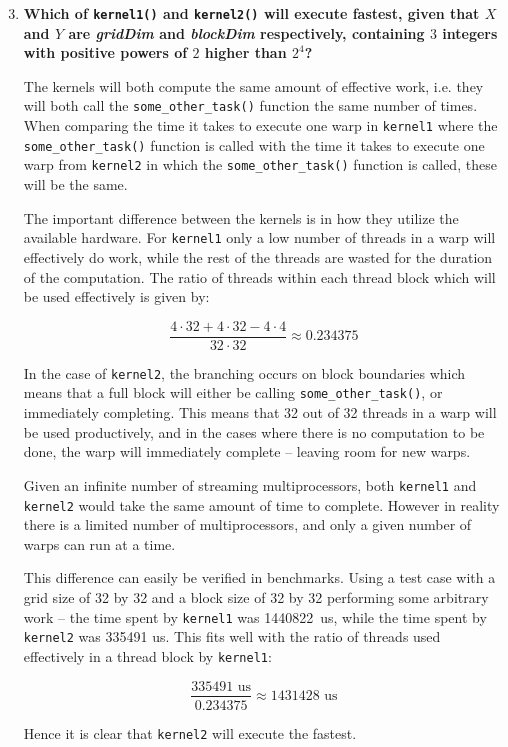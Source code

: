 \begin{enumerate}
\setcounter{enumi}{2}
\item \textbf{Which of \texttt{kernel1()} and \texttt{kernel2()} will execute fastest, given that $X$ and $Y$ are \textit{gridDim} and \textit{blockDim} respectively, containing $3$ integers with positive powers of $2$ higher than $2^4$?}

The kernels will both compute the same amount of effective work, i.e. they will both call the \texttt{some\_other\_task()} function the same number of times. When comparing the time it takes to execute one warp in \texttt{kernel1} where the \texttt{some\_other\_task()} function is called with the time it takes to execute one warp from \texttt{kernel2} in which the \texttt{some\_other\_task()} function is called, these will be the same.

The important difference between the kernels is in how they utilize the available hardware. For \texttt{kernel1} only a low number of threads in a warp will effectively do work, while the rest of the threads are wasted for the duration of the computation. The ratio of threads within each thread block which will be used effectively is given by:

\begin{displaymath}
\frac{4 \cdot 32 + 4 \cdot 32 - 4 \cdot 4}{32 \cdot 32} \approx 0.234375
\end{displaymath}

In the case of \texttt{kernel2}, the branching occurs on block boundaries which means that a full block will either be calling \texttt{some\_other\_task()}, or immediately completing. This means that 32 out of 32 threads in a warp will be used productively, and in the cases where there is no computation to be done, the warp will immediately complete -- leaving room for new warps.

Given an infinite number of streaming multiprocessors, both \texttt{kernel1} and \texttt{kernel2} would take the same amount of time to complete. However in reality there is a limited number of multiprocessors, and only a given number of warps can run at a time.

This difference can easily be verified in benchmarks. Using a test case with a grid size of 32 by 32 and a block size of 32 by 32 performing some arbitrary work -- the time spent by \texttt{kernel1} was 1440822~us, while the time spent by \texttt{kernel2} was 335491 us. This fits well with the ratio of threads used effectively in a thread block by \texttt{kernel1}:

\begin{displaymath}
\frac{335491\text{~us}}{0.234375} \approx 1431428\text{~us}
\end{displaymath}

Hence it is clear that \texttt{kernel2} will execute the fastest.

\end{enumerate}



